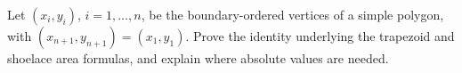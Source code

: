 Let $(x_i,y_i)$, $i=1,\ldots,n$, be the boundary-ordered vertices of a simple polygon, with $(x_{n+1},y_{n+1})=(x_1,y_1)$. Prove the identity underlying the trapezoid and shoelace area formulas, and explain where absolute values are needed.
